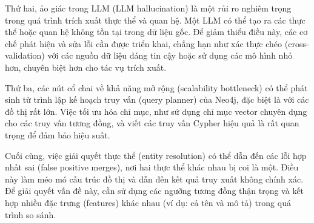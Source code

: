 Thứ hai, ảo giác trong LLM (LLM hallucination) là một rủi ro nghiêm trọng trong quá trình trích xuất thực thể và quan hệ. Một LLM có thể tạo ra các thực thể hoặc quan hệ không tồn tại trong dữ liệu gốc. Để giảm thiểu điều này, các cơ chế phát hiện và sửa lỗi cần được triển khai, chẳng hạn như xác thực chéo (cross-validation) với các nguồn dữ liệu đáng tin cậy hoặc sử dụng các mô hình nhỏ hơn, chuyên biệt hơn cho tác vụ trích xuất.

Thứ ba, các nút cổ chai về khả năng mở rộng (scalability bottleneck) có thể phát sinh từ trình lập kế hoạch truy vấn (query planner) của Neo4j, đặc biệt là với các đồ thị rất lớn. Việc tối ưu hóa chỉ mục, như sử dụng chỉ mục vector chuyên dụng cho các truy vấn tương đồng, và viết các truy vấn Cypher hiệu quả là rất quan trọng để đảm bảo hiệu suất.

Cuối cùng, việc giải quyết thực thể (entity resolution) có thể dẫn đến các lỗi hợp nhất sai (false positive merges), nơi hai thực thể khác nhau bị coi là một. Điều này làm méo mó cấu trúc đồ thị và dẫn đến kết quả truy xuất không chính xác. Để giải quyết vấn đề này, cần sử dụng các ngưỡng tương đồng thận trọng và kết hợp nhiều đặc trưng (features) khác nhau (ví dụ: cả tên và mô tả) trong quá trình so sánh.